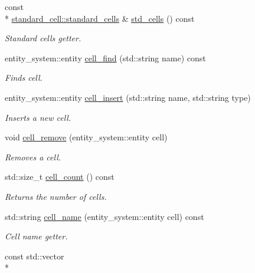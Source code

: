 \begin{DoxyCompactItemize}
\item 
const \\*
\hyperlink{classophidian_1_1standard__cell_1_1standard__cells}{standard\-\_\-cell\-::standard\-\_\-cells} \& \hyperlink{classophidian_1_1netlist_1_1netlist_a61ec8a8325b9f5d7a476b95cdb2f96c1}{std\-\_\-cells} () const 
\begin{DoxyCompactList}\small\item\em Standard cells getter. \end{DoxyCompactList}\item 
entity\-\_\-system\-::entity \hyperlink{classophidian_1_1netlist_1_1netlist_af4dacbc25bd1cd99d17751b8a7da3cb1}{cell\-\_\-find} (std\-::string name) const 
\begin{DoxyCompactList}\small\item\em Finds cell. \end{DoxyCompactList}\item 
entity\-\_\-system\-::entity \hyperlink{classophidian_1_1netlist_1_1netlist_a7c29f848aeff66ea9d8a8073578e1fd2}{cell\-\_\-insert} (std\-::string name, std\-::string type)
\begin{DoxyCompactList}\small\item\em Inserts a new cell. \end{DoxyCompactList}\item 
void \hyperlink{classophidian_1_1netlist_1_1netlist_a521ca41a5649374ffff3baa5e7af4302}{cell\-\_\-remove} (entity\-\_\-system\-::entity cell)
\begin{DoxyCompactList}\small\item\em Removes a cell. \end{DoxyCompactList}\item 
std\-::size\-\_\-t \hyperlink{classophidian_1_1netlist_1_1netlist_a5835db533e539df0a67385015bec7349}{cell\-\_\-count} () const 
\begin{DoxyCompactList}\small\item\em Returns the number of cells. \end{DoxyCompactList}\item 
std\-::string \hyperlink{classophidian_1_1netlist_1_1netlist_ab6faba046643e65f464b44f8ee141409}{cell\-\_\-name} (entity\-\_\-system\-::entity cell) const 
\begin{DoxyCompactList}\small\item\em Cell name getter. \end{DoxyCompactList}\item 
const std\-::vector\\*

\end{DoxyCompactItemize}
